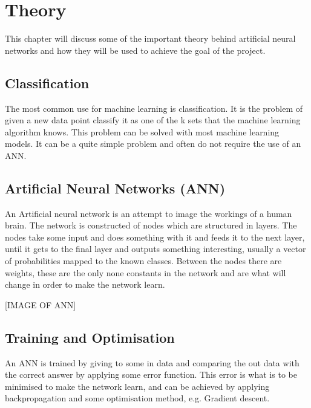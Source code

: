 \chapter{Theory}
This chapter will discuss some of the important theory behind artificial neural networks and how they will be used to achieve the goal of the project.

\section{Classification}
The most common use for machine learning is classification. It is the problem of given a new data point classify it as one of the k sets that the machine learning algorithm knows. This problem can be solved with most machine learning models. It can be a quite simple problem and often do not require the use of an ANN. %
\section{Artificial Neural Networks (ANN)}
An Artificial neural network is an attempt to image the workings of a human brain. The network is constructed of nodes which are structured in layers. The nodes take some input and does something with it and feeds it to the next layer, until it gets to the final layer and outputs something interesting, usually a vector of probabilities mapped to the known classes. Between the nodes there are weights, these are the only none constants in the network and are what will change in order to make the network learn.

[IMAGE OF ANN]

\section{Training and Optimisation} %
An ANN is trained by giving to some in data and comparing the out data with the correct answer by applying some error function. This error is what is to be minimised to make the network learn, and can be achieved by applying backpropagation and some optimisation method, e.g. Gradient descent.

